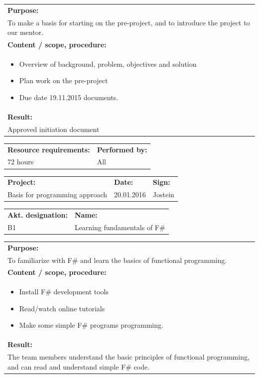 \documentclass[12pt, a4paper]{article}
\begin{document}
\begin{tabularx}{\textwidth}{|X|}
	\textbf{Purpose:}\\
	To make a basis for starting on the pre-project, and to introduce the project to our mentor.\\
	\hline
	\textbf{Content / scope, procedure:}\\
	\begin{itemize}[noitemsep,topsep=0pt]
		\item Overview of background, problem, objectives and solution
		\item Plan work on the pre-project
		\item Due date 19.11.2015
 documents.
	\end{itemize}\\
 	\hline
	\textbf{Result:}\\
	 Approved initiation document\\
	\hline
\end{tabularx}

\begin{tabularx}{\textwidth}{|X|p{30mm}|}
	\textbf{Resource requirements:}&\textbf{Performed by:}\\
	72 hours&All\\
	\hline
\end{tabularx}

\newpage


\begin{tabularx}{\textwidth}{|X|p{32mm}|p{20mm}|}
	\hline
	\textbf{Project:}&\textbf{Date:}&\textbf{Sign:}\\
	Basis for programming approach&20.01.2016&Jostein\\
	\hline
\end{tabularx}

\begin{tabularx}{\textwidth}{|p{40mm}|X|}
	\textbf{Akt. designation:}&\textbf{Name:}\\
	B1&Learning fundamentals of F\#\\
	\hline
\end{tabularx}

\begin{tabularx}{\textwidth}{|X|}
	\textbf{Purpose:}\\
	To familiarize with F\# and learn the basics of functional programming.\\
	\hline
	\textbf{Content / scope, procedure:}\\
	\begin{itemize}[noitemsep,topsep=0pt]
		\item Install F\# development tools
		\item Read/watch online tutorials
		\item Make some simple F\# programs
 programming.
	\end{itemize}\\
 	\hline
	\textbf{Result:}\\
	The team members understand the basic principles of functional programming, and can read and understand simple F\# code.\\
	\hline
\end{tabularx}
\end{document}
